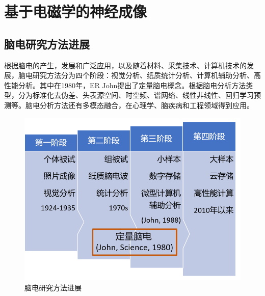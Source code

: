 \thesischapterexordium

\section{基于电磁学的神经成像}
\subsection{脑电研究方法进展}
根据脑电的产生，发展和广泛应用，以及随着材料、采集技术、计算机技术的发展，脑电研究方法分为四个阶段：视觉分析、纸质统计分析、计算机辅助分析、高性能分析。其中在1980年，ER John提出了定量脑电概念。根据脑电分析方法类型，分为标准化去伪差、头表源空间、时空频、谱网络、线性非线性、回归学习预测等。脑电分析方法还有多模态融合，在心理学、脑疾病和工程领域得到应用。

\begin{figure}
	\includegraphics[width=15cm]{pic/xulun/figure1.png}
	\caption{脑电研究方法进展}
\end{figure}


